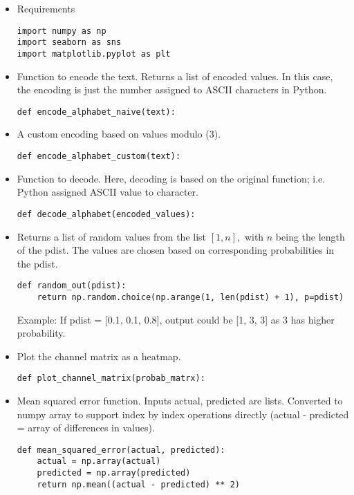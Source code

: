\documentclass{scrartcl}
\begin{document}
\begin{itemize}
    \item Requirements
\begin{verbatim}
import numpy as np
import seaborn as sns
import matplotlib.pyplot as plt
\end{verbatim}

\item {Function to encode the text. Returns a list of encoded values. In this case, the encoding is just the number assigned to ASCII characters in Python.}
\begin{verbatim}
def encode_alphabet_naive(text):
\end{verbatim}

\item A custom encoding based on values modulo (3).
\begin{verbatim}
def encode_alphabet_custom(text):
\end{verbatim}

\item Function to decode. Here, decoding is based on the original function; i.e. Python assigned ASCII value to character.
\begin{verbatim}
def decode_alphabet(encoded_values):
\end{verbatim}

\item Returns a list of random values from the list $[1, n],$ with $n$ being the length of the pdist. The values are chosen based on corresponding probabilities in the pdist.
\begin{verbatim}
def random_out(pdist):
    return np.random.choice(np.arange(1, len(pdist) + 1), p=pdist)
\end{verbatim}
Example: If pdist = [0.1, 0.1, 0.8], output could be [1, 3, 3] as 3 has higher probability.

\item Plot the channel matrix as a heatmap.
\begin{verbatim}
def plot_channel_matrix(probab_matrx):
\end{verbatim}

\item Mean squared error function. Inputs actual, predicted are lists. Converted to numpy array to support index by index operations directly (actual - predicted = array of differences in values).
\begin{verbatim}
def mean_squared_error(actual, predicted):
    actual = np.array(actual)
    predicted = np.array(predicted)
    return np.mean((actual - predicted) ** 2)
\end{verbatim}


\end{itemize}
\end{document}
